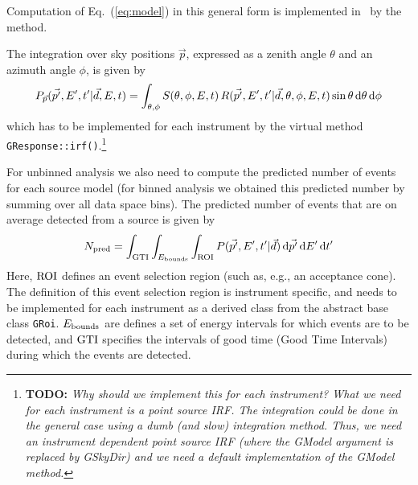 \documentclass{article}[12pt,a4]
\begin{document}
Computation of Eq.~(\ref{eq:model}) in this general form is implemented in \this\ by the 
method.


The integration over sky positions $\vec{p}$, expressed as a zenith angle $\theta$ and an
azimuth angle $\phi$, is given by
\begin{equation}
P_{\vec{p}}(\vec{p'}, E', t' | \vec{d}, E, t) = 
\int_{\theta, \phi} S(\theta, \phi, E, t) \, R(\vec{p'}, E', t' | \vec{d}, \theta, \phi, E, t)
\sin \theta \, {\rm d}\theta \, {\rm d}\phi
\label{eq:pirf}
\end{equation}
which has to be implemented for each instrument by the virtual method
{\tt GResponse::irf()}.\footnote{
  {\bf TODO:}
  {\em Why should we implement this for each instrument?
  What we need for each instrument is a point source IRF.
  The integration could be done in the general case using a dumb (and slow)
integration method.
  Thus, we need an instrument dependent point source IRF (where the GModel argument
is replaced by GSkyDir) and we need a default implementation of  the GModel method.}
}

For unbinned analysis we also need to compute the predicted number of events
for each source model (for binned analysis we obtained this predicted number by
summing over all data space bins).
The predicted number of events that are on average detected from a source is given by
\begin{equation}
N_{\rm pred} = \int_{\rm GTI} \int_{E_{\rm bounds}} \int_{\rm ROI} 
P(\vec{p'}, E', t' | \vec{d}) \, {\rm d}\vec{p'} \, {\rm d}E' \,{\rm d}t'
\label{eq:npred}
\end{equation}
Here, ${\rm ROI}$ defines an event selection region (such as, e.g., an acceptance cone).
The definition of this event selection region is instrument specific, and needs to be
implemented for each instrument as a derived class from the abstract base class {\tt GRoi}.
$E_{\rm bounds}$ are defines a set of energy intervals for which events are to be detected,
and ${\rm GTI}$ specifies the intervals of good time (Good Time Intervals) during which
the events are detected.
\end{document}
